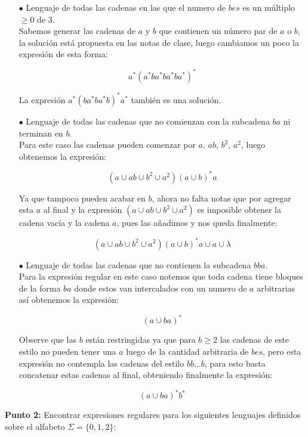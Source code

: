\begin{itemize}
    \item[$\bullet$]Lenguaje de todas las cadenas en las que el numero de $bes$ es un múltiplo $\geq0$ de 3.\\ 

    Sabemos generar las cadenas de $a$ y $b$ que contienen un número par de $a$ o $b$, la solución está propuesta en las notas de clase, luego cambiamos un poco la expresión de esta forma:

    $$a^*(a^*ba^*ba^*ba^*)^*$$

    La expresión $a^*(ba^*ba^*b)^*a^*$ también es una solución.

    \item[$\bullet$] Lenguaje de todas las cadenas que no comienzan con la subcadena $ba$ ni terminan en $b.$\\ 

    Para este caso las cadenas pueden comenzar por $a$, $ab$, $b^2$, $a^2$, luego obtenemos la expresión:

    $$(a\cup ab \cup b^2 \cup a^2)(a \cup b)^*a $$

    Ya que tampoco pueden acabar en $b$, ahora no falta notas que por agregar esta $a$ al final y la expresión $(a\cup ab \cup b^2 \cup a^2)$ es imposible obtener la cadena vacía y la cadena $a$, pues las añadimos y nos queda finalmente:

     $$(a\cup ab \cup b^2 \cup a^2)(a \cup b)^*a \cup a \cup \lambda$$

     \item[$\bullet$] Lenguaje de todas las cadenas que no contienen la subcadena $bba.$\\ 

     Para la expresión regular en este caso notemos que toda cadena tiene bloques de la forma $ba$ donde estos van intercalados con un numero de $a$ arbitrarias así obtenemos la expresión:

     $$(a\cup ba)^*$$

     Observe que las $b$ están restringidas ya que para $b\geq 2$ las cadenas de este estilo no pueden tener una $a$ luego de la cantidad arbitraria de $bes$, pero esta expresión no contempla las cadenas del estilo $bb\dots b$, para esto basta concatenar estas cadenas al final, obteniendo finalmente la expresión:

     $$(a\cup ba)^*b^*$$

\end{itemize}

\textbf{Punto 2: } Encontrar expresiones regulares para los siguientes lenguajes definidos sobre el alfabeto $\Sigma=\{0,1,2\}:$

